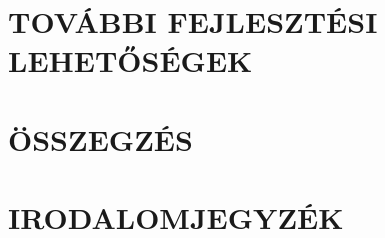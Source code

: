 \documentclass[12pt,a4paper]{article}
\begin{document}
\clearpage
\section{TOVÁBBI FEJLESZTÉSI LEHETŐSÉGEK}
\label{sec:further}


\clearpage
\section{ÖSSZEGZÉS}

\fi



\clearpage
\section{IRODALOMJEGYZÉK}
\printbibliography[heading=none]

\clearpage
\renewcommand{\listfigurename}{ÁBRAJEGYZÉK}
\listoffigures

\clearpage
\renewcommand{\listtablename}{TÁBLAJEGYZÉK}
\listoftables

\clearpage
\renewcommand{\lstlistlistingname}{FORRÁSKÓDJEGYZÉK}
\lstlistoflistings
\end{document}
